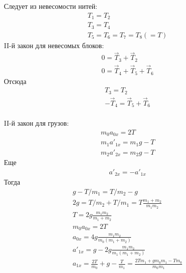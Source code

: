 \documentclass[a5paper,10pt]{article}\usepackage[usenames,dvipsnames]{color}\usepackage{extsizes,cmap,graphicx,misccorr,indentfirst,makecell,multirow,ulem,geometry,amssymb,amsfonts,amsmath,amsthm,titlesec,float,fancyhdr,wrapfig,tikz}\usepackage[T2A]{fontenc}\usepackage[utf8x]{inputenc}\usepackage[english, russian]{babel}\usetikzlibrary{decorations.pathreplacing,decorations.pathmorphing,patterns,calc,scopes,arrows,through,positioning,shapes.misc}\graphicspath{{img/}}\linespread{1.3}\frenchspacing\geometry{left=1cm, right=1cm, top=2cm, bottom=1cm, bindingoffset=0cm}\pagestyle{fancy}\fancyhead{}\fancyhead[R]{Сарафанов Ф.Г.}
\begin{document}
Следует из невесомости нитей:
\begin{gather*}
    T_1=T_2\\
    T_3=T_4\\
    T_5=T_6=T_7=T_8(=T)
\end{gather*}
II-й закон для невесомых блоков:
\begin{gather*}
    0=\vec{T}_3+\vec{T}_2\\
    0=\vec{T}_4+\vec{T}_5+\vec{T}_6
\end{gather*}
Отсюда 
\begin{gather*}
    T_3=T_2\\
    -\vec{T}_4=\vec{T}_5+\vec{T}_6
\end{gather*}
\\
II-й закон для грузов:
\begin{gather*}
    m_0a_{0x}=2T\\
    m_1a'_{1x}=m_1g-T\\
    m_2a'_{2x}=m_2g-T
\end{gather*}
Еще
\begin{gather*}
    a'_{2x}=-a'_{1x}
\end{gather*}
Тогда
\begin{gather*}
    g-T/m_1=T/m_2-g\\
    2g=T/m_2+T/m_1=T\frac{m_1+m_2}{m_1m_2}\\
    T=2g\frac{m_1m_2}{m_1+m_2}\\
    m_0a_{0x}=2T\\
    a_{0x}=4g\frac{m_1m_2}{m_0(m_1+m_2)}\\
    a'_{1x}=g-2g\frac{m_1m_2}{m_1(m_1+m_2)}\\
    a_{1x}=\frac{2T}{m_0}+g-\frac{T}{m_1}=\frac{2Tm_1+gm_0m_1-Tm_0}{m_0m_1}
\end{gather*}
\end{document}
